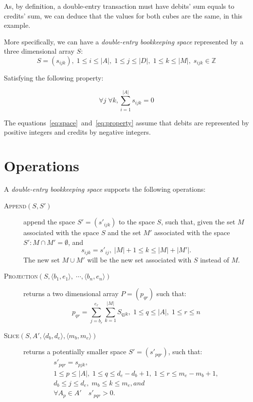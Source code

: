 \documentclass{article}
\begin{document}
As, by definition, a double-entry transaction must have debits' sum
equals to credits' sum, we can deduce that the values for both
cubes are the same, in this example.

More specifically, we can have a \emph{double-entry bookkeeping space} 
represented by a three dimensional array $S$:
\begin{equation}
	\label{eq:space}
	S = \left(s_{ijk}\right), 
	\; 1 \leq i \leq |A|, \; 1 \leq j \leq |D|, \; 1 \leq k \leq |M|, 
	\; s_{ijk} \in \mathbb{Z}
\end{equation}

Satisfying the following property:

\begin{equation}
	\label{eq:property}
	\forall j \; \forall k, \sum_{i=1}^{|A|}{s_{ijk}} = 0
\end{equation}

The equations~\eqref{eq:space}~and~\eqref{eq:property}
assume that debits are represented by positive integers
and credits by negative integers.

\section{Operations}

A \emph{double-entry bookkeeping space} supports the following operations:

\begin{description}
	\item[\textsc{Append}$(S,S')$] append the space
	$S'=\left(s'_{ijk}\right)$ to the space $S$,
		such that, given the set $M$ associated with the space $S$ and
		the set $M'$ associated with the space $S':
		M \cap M' = \emptyset$, and
		\[
			s_{ijk} = s'_{ij}, \; |M|+1 \leq k \leq |M|+|M'|.
		\]
		The new set $M \cup M'$ will be the new set associated with $S$
		instead of $M$.

	\item[\textsc{Projection}$(S, \langle b_1, e_1 \rangle, \; \cdots,
		\langle b_n, e_n \rangle)$] 
		returns a two dimensional array $P=\left(p_{qr}\right)$ such that:
		\[
			p_{qr} = \sum_{j=b_r}^{e_r}{\sum_{k=1}^{|M|}{S_{qjk}}}, 
				\; 1 \leq q \leq |A|, \; 1 \leq r \leq n
		\]

	\item[\textsc{Slice}$(S, A', \langle d_b,d_e \rangle, \langle m_b,m_e \rangle)$] 
		returns a potentially smaller space $S'=\left(s'_{pqr}\right)$, such that:
		\[
			\begin{array}{l}
				s'_{pqr} = s_{pjk}, \\
				1 \leq p \leq |A|, \;1 \leq q \leq d_e-d_b+1, \; 1 \leq r \leq m_e-m_b+1, \\
				d_b \leq j \leq d_e, \; m_b \leq k \leq m_e, and \\
				\forall A_{p} \in A' \quad s'_{pqr} > 0.
			\end{array}			
		\]

\end{description}
\end{document}
